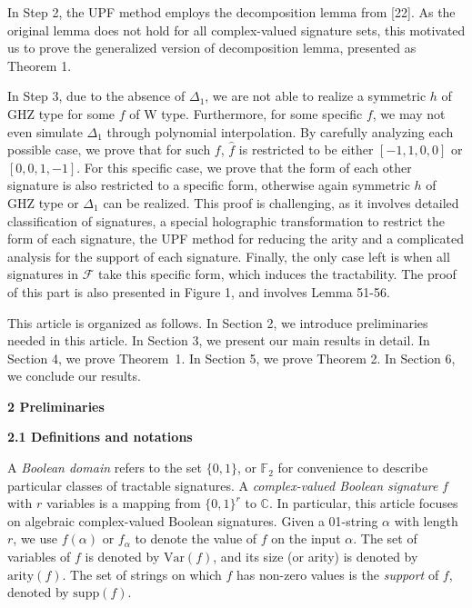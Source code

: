 In Step 2, the UPF method employs the decomposition lemma from [22]. As the original lemma does not hold for all complex-valued signature sets, this motivated us to prove the generalized version of decomposition lemma, presented as Theorem 1.\par




In Step 3, due to the absence of $\Delta_{1}$, we are not able to realize a symmetric $h$ of GHZ type for some $f$ of W type. Furthermore, for some specific $f$, we may not even simulate $\Delta_{1}$ through polynomial interpolation. By carefully analyzing each possible case, we prove that for such $f$, $\widehat{f}$ is restricted to be either $[-1,1,0,0]$ or $[0,0,1,-1]$. For this specific case, we prove that the form of each other signature is also restricted to a specific form, otherwise again symmetric $h$ of GHZ type or $\Delta_{1}$ can be realized. This proof is challenging, as it involves detailed classification of signatures, a special holographic transformation to restrict the form of each signature, the UPF method for reducing the arity and a complicated analysis for the support of each signature. Finally, the only case left is when all signatures in $\mathcal{F}$ take this specific form, which induces the tractability. The proof of this part is also presented in Figure 1, and involves Lemma 51-56.\par




This article is organized as follows.
In Section 2, we introduce preliminaries needed in this article.
In Section 3, we present our main results in detail.
In Section 4, we prove Theorem 1.
In Section 5, we prove Theorem 2.
In Section 6, we conclude our results.\par





\par\medskip\noindent\textbf{
2 Preliminaries}\par




\par\medskip\noindent\textbf{
2.1 Definitions and notations}\par




A \emph{Boolean domain} refers to the set $\{0,1\}$, or $\mathbb{F}_{2}$ for convenience to describe particular classes of tractable signatures. A \emph{complex-valued Boolean signature} $f$ with $r$ variables is a mapping from $\{0,1\}^{r}$ to $\mathbb{C}$. In particular, this article focuses on algebraic complex-valued Boolean signatures. Given a 01-string $\alpha$ with length $r$, we use $f(\alpha)$ or $f_{\alpha}$ to denote the value of $f$ on the input $\alpha$. The set of variables of $f$ is denoted by $\text{Var}(f)$, and its size (or arity) is denoted by $\text{arity}(f)$. The set of strings on which $f$ has non-zero values is the \emph{support} of $f$, denoted by $\text{supp}(f)$.\par




